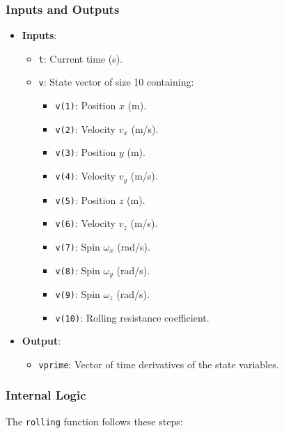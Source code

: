 \documentclass[10pt,a4paper]{report}
\begin{document}
\subsubsection{Inputs and Outputs}
\begin{itemize}
    \item \textbf{Inputs}:
    \begin{itemize}
        \item \texttt{t}: Current time (s).
        \item \texttt{v}: State vector of size 10 containing:
        \begin{itemize}
            \item \texttt{v(1)}: Position \(x\) (m).
            \item \texttt{v(2)}: Velocity \(v_x\) (m/s).
            \item \texttt{v(3)}: Position \(y\) (m).
            \item \texttt{v(4)}: Velocity \(v_y\) (m/s).
            \item \texttt{v(5)}: Position \(z\) (m).
            \item \texttt{v(6)}: Velocity \(v_z\) (m/s).
            \item \texttt{v(7)}: Spin \(\omega_x\) (rad/s).
            \item \texttt{v(8)}: Spin \(\omega_y\) (rad/s).
            \item \texttt{v(9)}: Spin \(\omega_z\) (rad/s).
            \item \texttt{v(10)}: Rolling resistance coefficient.
        \end{itemize}
    \end{itemize}
    \item \textbf{Output}:
    \begin{itemize}
        \item \texttt{vprime}: Vector of time derivatives of the state variables.
    \end{itemize}
\end{itemize}

\subsubsection{Internal Logic}
The \texttt{rolling} function follows these steps:
\end{document}
